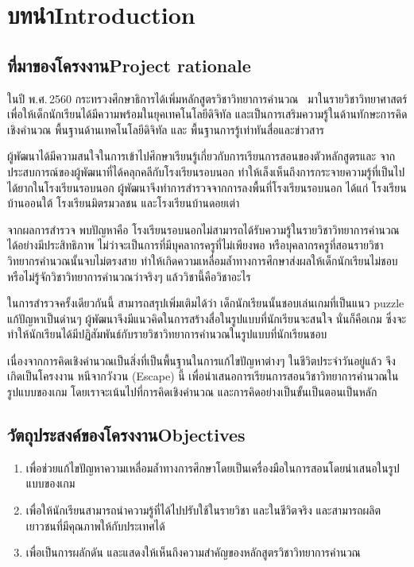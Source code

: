 \chapter{\ifcpe บทนำ\else Introduction\fi}

\section{\ifcpe ที่มาของโครงงาน\else Project rationale\fi}
ในปี พ.ศ.\,2560 กระทรวงศึกษาธิการได้เพิ่มหลักสูตรวิชาวิทยาการคำนวณ~\cite{cpc} มาในรายวิชาวิทยาศาสตร์
 เพื่อให้เด็กนักเรียนได้มีความพร้อมในยุคเทคโนโลยีดิจิทัล 
และเป็นการเสริมความรู้ในด้านทักษะการคิดเชิงคำนวณ 
พื้นฐานด้านเทคโนโลยีดิจิทัล และ พื้นฐานการรู้เท่าทันสื่อและข่าวสาร

ผู้พัฒนาได้มีความสนใจในการเข้าไปศึกษาเรียนรู้เกี่ยวกับการเรียนการสอนของตัวหลักสูตรและ
จากประสบการณ์ของผู้พัฒนาที่ได้คลุกคลีกับโรงเรียนรอบนอก
ทำให้เล็งเห็นถึงการกระจายความรู้ที่เป็นไปได้ยากในโรงเรียนรอบนอก ผู้พัฒนาจึงทำการสำรวจจากการลงพื้นที่โรงเรียนรอบนอก
 ได้แก่ โรงเรียนบ้านออนใต้ โรงเรียนมิตรมวลชน และโรงเรียนบ้านดอยเต่า

จากผลการสำรวจ พบปัญหาคือ โรงเรียนรอบนอกไม่สามารถได้รับความรู้ในรายวิชาวิทยาการคำนวณได้อย่างมีประสิทธิภาพ 
ไม่ว่าจะเป็นการที่มีบุคลากรครูที่ไม่เพียงพอ หรือบุคลากรครูที่สอนรายวิชาวิทยากรคำนวณนั้นจบไม่ตรงสาย 
ทำให้เกิดความเหลื่อมล้ำทางการศึกษาส่งผลให้เด็กนักเรียนไม่ชอบ หรือไม่รู้จักวิชาวิทยาการคำนวณว่าจริงๆ 
แล้ววิชานี้คือวิชาอะไร

ในการสำรวจครั้งเดียวกันนี้ สามารถสรุปเพิ่มเติมได้ว่า เด็กนักเรียนนั้นชอบเล่นเกมที่เป็นแนว puzzle แก้ปัญหาเป็นด่านๆ ผู้พัฒนาจึงมีแนวคิดในการสร้างสื่อในรูปแบบที่นักเรียนจะสนใจ นั่นก็คือเกม
ซึ่งจะทำให้นักเรียนได้มีปฏิสัมพันธ์กับรายวิชาวิทยาการคำนวณในรูปแบบที่นักเรียนชอบ

เนื่องจากการคิดเชิงคำนวณเป็นสิ่งที่เป็นพื้นฐานในการแก้ไขปัญหาต่างๆ ในชีวิตประจำวันอยู่แล้ว จึงเกิดเป็นโครงงาน หนีจากวังวน (Escape) นี้ เพื่อนำเสนอการเรียนการสอนวิชาวิทยาการคำนวณในรูปแบบของเกม
โดยเราจะเน้นไปที่การคิดเชิงคำนวณ และการคิดอย่างเป็นขั้นเป็นตอนเป็นหลัก

\section{\ifcpe วัตถุประสงค์ของโครงงาน\else Objectives\fi}
\begin{enumerate}
    \item เพื่อช่วยแก้ไขปัญหาความเหลื่อมล้ำทางการศึกษาโดยเป็นเครื่องมือในการสอนโดยนำเสนอในรูปแบบของเกม
    \item เพื่อให้นักเรียนสามารถนำความรู้ที่ได้ไปปรับใช้ในรายวิชา และในชีวิตจริง และสามารถผลิตเยาวชนที่มีคุณภาพให้กับประเทศได้
    \item เพื่อเป็นการผลักดัน และแสดงให้เห็นถึงความสำคัญของหลักสูตรวิชาวิทยาการคำนวณ
\end{enumerate}

